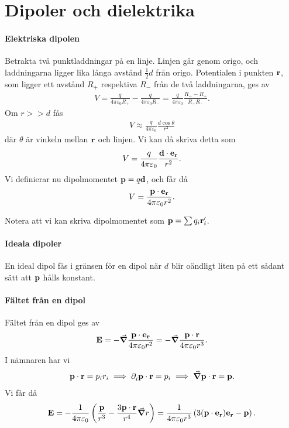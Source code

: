 \section{Dipoler och dielektrika}

\paragraph{Elektriska dipolen}
Betrakta två punktladdningar på en linje. Linjen går genom origo, och laddningarna ligger lika långa avstånd $\frac{1}{2}d$ från origo. Potentialen i punkten $\vb{r}$, som ligger ett avstånd $R_{+}$ respektiva $R_{-}$ från de två laddningarna, ges av
\begin{align*}
	V = \frac{q}{4\pi\varepsilon_{0}R_{+}} - \frac{q}{4\pi\varepsilon_{0}R_{-}} = \frac{q}{4\pi\varepsilon_{0}}\frac{R_{-} - R_{+}}{R_{+}R_{-}}.
\end{align*}
Om $r >> d$ fås
\begin{align*}
	V \approx \frac{q}{4\pi\varepsilon_{0}}\frac{d\cos{\theta}}{r^{2}}
\end{align*}
där $\theta$ är vinkeln mellan $\vb{r}$ och linjen. Vi kan då skriva detta som
\begin{align*}
	V = \frac{q}{4\pi\varepsilon_{0}}\frac{\vb{d}\cdot\vb{e}_{\vb{r}}}{r^{2}}.
\end{align*}
Vi definierar nu dipolmomentet $\vb{p} = q\vb{d}$, och får då
\begin{align*}
	V = \frac{\vb{p}\cdot\vb{e}_{\vb{r}}}{4\pi\varepsilon_{0}r^{2}}.
\end{align*}

Notera att vi kan skriva dipolmomentet som $\vb{p} = \sum q_{i}\vb{r}_{i}^{\prime}$.

\paragraph{Ideala dipoler}
En ideal dipol fås i gränsen för en dipol när $d$ blir oändligt liten på ett sådant sätt att $\vb{p}$ hålls konstant.

\paragraph{Fältet från en dipol}
Fältet från en dipol ges av
\begin{align*}
	\vb{E} = -\grad{\frac{\vb{p}\cdot\vb{e}_{\vb{r}}}{4\pi\varepsilon_{0}r^{2}}} = -\grad{\frac{\vb{p}\cdot\vb{r}}{4\pi\varepsilon_{0}r^{3}}}.
\end{align*}
I nämnaren har vi
\begin{align*}
	\vb{p}\cdot\vb{r} = p_{i}r_{i} \implies \partial_{i}^{}\vb{p}\cdot\vb{r} = p_{i} \implies \grad{\vb{p}\cdot\vb{r}} = \vb{p}.
\end{align*}
Vi får då
\begin{align*}
	\vb{E} = -\frac{1}{4\pi\varepsilon_{0}}\left(\frac{\vb{p}}{r^{3}} - \frac{3\vb{p}\cdot\vb{r}}{r^{4}}\grad{r}\right) = \frac{1}{4\pi\varepsilon_{0}r^{3}}\left(3(\vb{p}\cdot\vb{e}_{\vb{r}})\vb{e}_{\vb{r}} - \vb{p}\right).
\end{align*}

